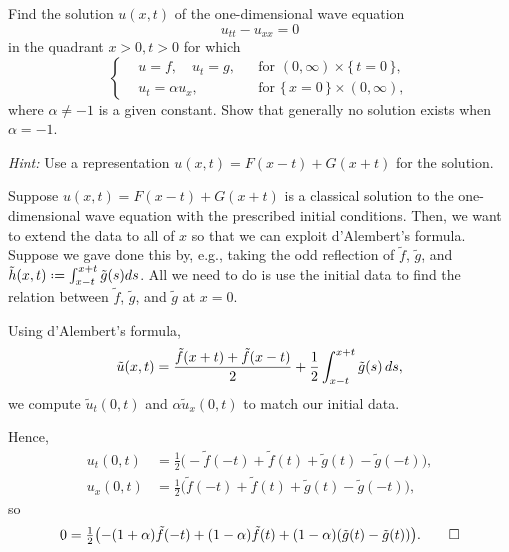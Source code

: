 \begin{problem}
  Find the solution \(u(x,t)\) of the one-dimensional wave equation
  \[
    u_{tt}-u_{xx}=0
  \]
  in the quadrant \(x>0,t>0\) for which
  \[
    \left\{
      \begin{aligned}
        &u=f,\quad u_t=g,%
        &&\text{for \((0,\infty)\times\{\,t=0\,\}\),}\\
        &u_t=\alpha u_x,%
        &&\text{for \(\{\,x=0\,\}\times(0,\infty)\)},
      \end{aligned}
    \right.
  \]
  where \(\alpha\neq -1\) is a given constant. Show that generally no
  solution exists when \(\alpha=-1\).

  \noindent\emph{Hint:} Use a representation \(u(x,t)=F(x-t)+G(x+t)\) for the
  solution.
\end{problem}
\begin{solution*}
  Suppose \(u(x,t)=F(x-t)+G(x+t)\) is a classical solution to the
  one-dimensional wave equation with the prescribed initial
  conditions. Then, we want to extend the data to all of \(x\) so that we
  can exploit d'Alembert's formula. Suppose we gave done this by, e.g.,
  taking the odd reflection of \(\tilde f\), \(\tilde g\), and
  \(\tilde h(x,t)\defeq \int_{x-t}^{x+t} \tilde g(s)ds\). All we need to do
  is use the initial data to find the relation between \(\tilde f\),
  \(\tilde g\), and \(\tilde g\) at \(x=0\).

  Using d'Alembert's formula,
  \[
    \tilde u(x,t) =\frac{\tilde f(x+t)+\tilde
      f(x-t)}{2}+\frac{1}{2}\int_{x-t}^{x+t}\tilde g(s)\mathop{}\!d s,
  \]
  we compute \(\tilde u_t(0,t)\) and \(\alpha\tilde u_x(0,t)\) to match
  our initial data.

  Hence,
  \begin{align*}
    u_t(0,t)&=\tfrac{1}{2}
              \bigl(-\tilde f(-t)+\tilde f(t)+\tilde g(t)-\tilde g(-t)\bigr),\\
    u_x(0,t)&=\tfrac{1}{2}
              \bigl(\tilde f(-t)+\tilde f(t)+\tilde g(t)-\tilde g(-t)\bigr),
  \end{align*}
  so
  \[
    0=\tfrac{1}{2}\bigl(-(1+\alpha)\tilde f(-t)+(1-\alpha)\tilde
    f(t)+(1-\alpha)(\tilde g(t)-\tilde g(t))\bigr).\qedhere
  \]
\end{solution*}

